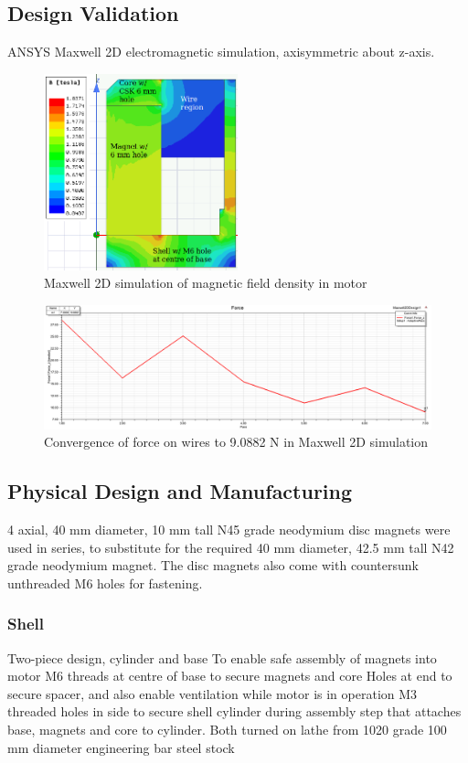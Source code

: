 \documentclass[a4paper,12pt]{article}
\begin{document}
\subsection{Design Validation}
ANSYS Maxwell 2D electromagnetic simulation, axisymmetric about z-axis.
\begin{figure}[h!] 
	\centering
	\includegraphics[width=0.5\textwidth]{maxwell.png}
	\caption{Maxwell 2D simulation of magnetic field density in motor}
	\label{fg:maxwellB}
\end{figure}

\begin{figure}[h!] 
	\centering
	\includegraphics[width=\textwidth]{force.png}
	\caption{Convergence of force on wires to 9.0882 N in Maxwell 2D simulation}
	\label{fg:maxwellforce}
\end{figure}

\subsection{Physical Design and Manufacturing}
4 axial, 40 mm diameter, 10 mm tall N45 grade neodymium disc magnets were used in series, to substitute for the required 40 mm diameter, 42.5 mm tall N42 grade neodymium magnet. The disc magnets also come with countersunk unthreaded M6 holes for fastening. 

\subsubsection{Shell}
Two-piece design, cylinder and base
To enable safe assembly of magnets into motor
M6 threads at centre of base to secure magnets and core
Holes at end to secure spacer, and also enable ventilation while motor is in operation
M3 threaded holes in side to secure shell cylinder during assembly step that attaches base, magnets and core to cylinder.
Both turned on lathe from 1020 grade 100 mm diameter engineering bar steel stock
\end{document}
